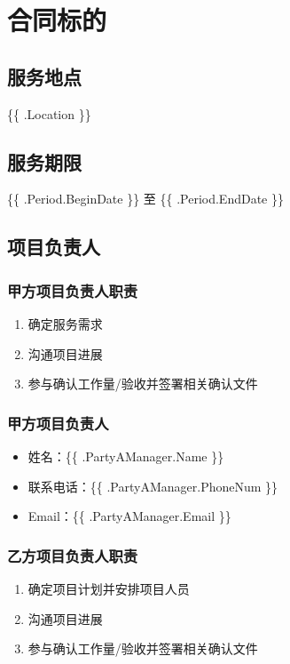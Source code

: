 \section{合同标的}

\subsection{服务地点}
\{\{ .Location \}\}

\subsection{服务期限}
\{\{ .Period.BeginDate \}\} 至 \{\{ .Period.EndDate \}\}

\subsection{项目负责人}
\subsubsection{甲方项目负责人职责} 
\begin{enumerate}
  \item 确定服务需求
  \item 沟通项目进展
  \item 参与确认工作量/验收并签署相关确认文件
\end{enumerate}

\subsubsection{甲方项目负责人} 
\begin{itemize}
  \item 姓名：\{\{ .PartyAManager.Name \}\}
  \item 联系电话：\{\{ .PartyAManager.PhoneNum \}\}
  \item Email：\{\{ .PartyAManager.Email \}\}
\end{itemize}

\subsubsection{乙方项目负责人职责}
\begin{enumerate}
  \item 确定项目计划并安排项目人员
  \item 沟通项目进展
  \item 参与确认工作量/验收并签署相关确认文件
\end{enumerate}

